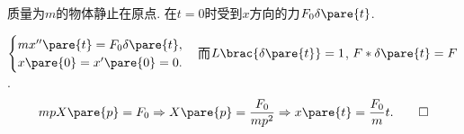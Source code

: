 \documentclass[../ComplexVariable.tex]{subfiles}
\begin{document}
\begin{sample}
    \begin{ex}
        质量为$m$的物体静止在原点. 在$t=0$时受到$x$方向的力$F_0\delta\pare{t}$.
    \end{ex}
    \begin{solution}
        $\displaystyle \begin{cases}
            mx''\pare{t} = F_0\delta\pare{t}, \\
            x\pare{0} = x'\pare{0} = 0.
        \end{cases}$而$L\brac{\delta\pare{t}} = 1$, $F*\delta\pare{t} = F$.
        \[ mpX\pare{p} = F_0 \Rightarrow X\pare{p} = \frac{F_0}{mp^2} \Rightarrow x\pare{t} = \frac{F_0}{m}t. \qedhere \]
    \end{solution}
\end{sample}


\end{document}
